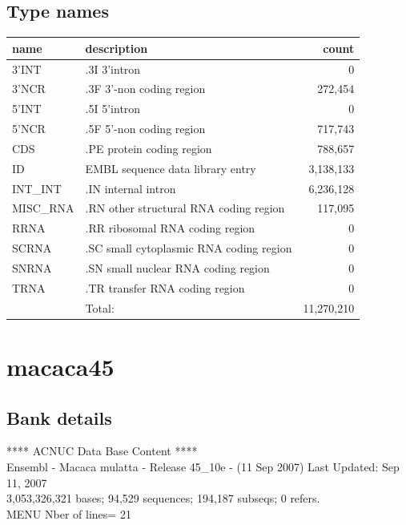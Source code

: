 \documentclass{article}
\begin{document}
\begin{Schunk}
\subsection{Type names}
\noindent\begin{tabular}{llr}
\hline \hline
name & description & count \\
\hline
3'INT  &  .3I 3'intron  &  0 \\
3'NCR  &  .3F  3'-non coding region  &  272,454 \\
5'INT  &  .5I 5'intron  &  0 \\
5'NCR  &  .5F  5'-non coding region  &  717,743 \\
CDS  &  .PE protein coding region  &  788,657 \\
ID  &  EMBL sequence data library entry  &  3,138,133 \\
INT\_INT  &  .IN  internal intron  &  6,236,128 \\
MISC\_RNA  &  .RN other structural RNA coding region  &  117,095 \\
RRNA  &  .RR ribosomal RNA coding region  &  0 \\
SCRNA  &  .SC small cytoplasmic RNA coding region  &  0 \\
SNRNA  &  .SN small nuclear RNA coding region  &  0 \\
TRNA  &  .TR transfer RNA coding region  &  0 \\
\hline
 & Total: & 11,270,210 \\
\hline \hline
\end{tabular}

\section{ macaca45 }
\subsection{Bank details}
             ****     ACNUC Data Base Content      ****                         \\
Ensembl - Macaca mulatta - Release 45\_10e - (11 Sep 2007) Last Updated: Sep 11, 2007\\
3,053,326,321 bases; 94,529 sequences; 194,187 subseqs; 0 refers.\\
MENU Nber of lines= 21                                                         


\end{Schunk}
\end{document}
